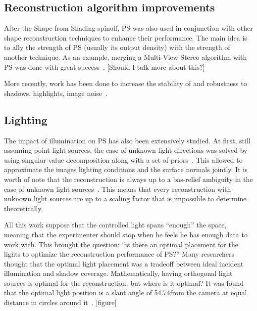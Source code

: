 \documentclass{report}
\begin{document}
\subsection{Reconstruction algorithm improvements}
After the Shape from Shading spinoff, PS was also used in conjunction with other shape reconstruction techniques to enhance their performance. The main idea is to ally the strength of PS (usually its output density) with the strength of another technique. As an example, merging a Multi-View Stereo algorithm with PS was done with great success~\cite{HernandezEsteban2008}.
[Should I talk more about this?]

More recently, work has been done to increase the stability of and robustness to shadows, highlights, image noise~\cite{BarskyPetrou-pami-2003,ikehata-cvpr-12,ikehata-cvpr-14}.

\subsection{Lighting}
The impact of illumination on PS has also been extensively studied. At first, still assuming point light sources, the case of unknown light directions was solved by using singular value decomposition along with a set of priors~\cite{Hayakawa1994}. This allowed to approximate the images lighting conditions and the surface normals jointly. It is worth of note that the reconstruction is always up to a bas-relief ambiguity in the case of unknown light sources~\cite{Belhumeur1999}. This means that every reconstruction with unknown light sources are up to a scaling factor that is impossible to determine theoretically.

All this work suppose that the controlled light spans ``enough'' the space, meaning that the experimenter should stop when he feels he has enough data to work with. This brought the question: ``is there an optimal placement for the lights to optimize the reconstruction performance of PS?'' Many researchers thought that the optimal light placement was a tradeoff between ideal incident illumination and shadow coverage. Mathematically, having orthogonal light sources is optimal for the reconstruction, but where is it optimal? It was found that the optimal light position is a slant angle of 54.74\degree from the camera at equal distance in circles around it~\cite{spence-iwtas-03,drbohlav-iccv-05}. [figure]
\end{document}
